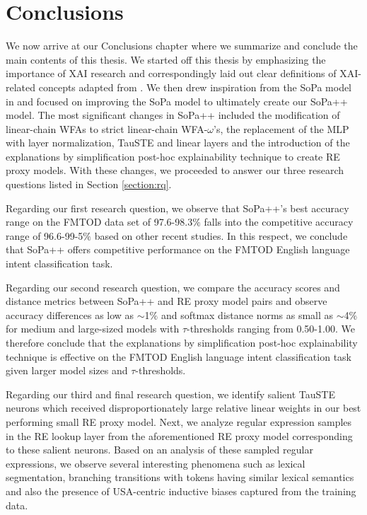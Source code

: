 \chapter{Conclusions}

\label{chapter:conclusions}

We now arrive at our Conclusions chapter where we summarize and conclude the
main contents of this thesis. We started off this thesis by emphasizing the
importance of XAI research and correspondingly laid out clear definitions of
XAI-related concepts adapted from \citet{arrieta2020explainable}. We then drew
inspiration from the SoPa model in \citet{schwartz2018sopa} and focused on
improving the SoPa model to ultimately create our SoPa++ model. The most
significant changes in SoPa++ included the modification of linear-chain WFAs to
strict linear-chain WFA-$\omega$'s, the replacement of the MLP with layer
normalization, TauSTE and linear layers and the introduction of the explanations
by simplification post-hoc explainability technique to create RE proxy models.
With these changes, we proceeded to answer our three research questions listed
in Section \ref{section:rq}.

Regarding our first research question, we observe that SoPa++'s best accuracy
range on the FMTOD data set of 97.6-98.3$\%$ falls into the competitive accuracy
range of 96.6-99-5$\%$ based on other recent studies. In this respect, we
conclude that SoPa++ offers competitive performance on the FMTOD English
language intent classification task.

Regarding our second research question, we compare the accuracy scores and
distance metrics between SoPa++ and RE proxy model pairs and observe accuracy
differences as low as $\sim$1$\%$ and softmax distance norms as small as $\sim$4$\%$ for
medium and large-sized models with $\tau$-thresholds ranging from 0.50-1.00. We
therefore conclude that the explanations by simplification post-hoc
explainability technique is effective on the FMTOD English language intent
classification task given larger model sizes and $\tau$-thresholds.

Regarding our third and final research question, we identify salient TauSTE
neurons which received disproportionately large relative linear weights in our
best performing small RE proxy model. Next, we analyze regular expression
samples in the RE lookup layer from the aforementioned RE proxy model
corresponding to these salient neurons. Based on an analysis of these sampled
regular expressions, we observe several interesting phenomena such as lexical
segmentation, branching transitions with tokens having similar lexical semantics
and also the presence of USA-centric inductive biases captured from the training
data.

